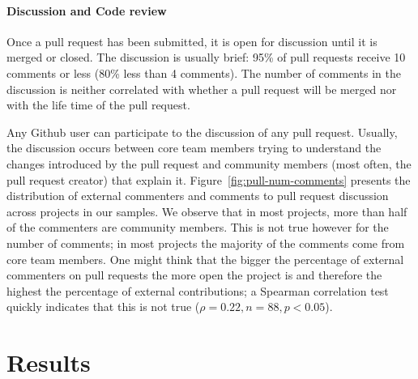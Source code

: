 \documentclass{sig-alternate}
\begin{document}
\paragraph*{Discussion and Code review}

Once a pull request has been submitted, it is open for discussion until
it is merged or closed. The discussion is usually brief: 95\% of pull
requests receive 10 comments or less (80\% less than 4 comments). 
The number of comments in the discussion is neither correlated with
whether a pull request will be merged nor with the life time of the
pull request.

Any Github user can participate to the discussion of any pull request.  Usually,
the discussion occurs between core team members trying to understand the changes
introduced by the pull request and community members (most often, the pull
request creator) that explain it.  Figure~\ref{fig:pull-num-comments} presents
the distribution of external commenters and comments to pull request discussion
across projects in our samples. We observe that in most projects, more than half
of the commenters are community members. This is not true however for the number
of comments; in most projects the majority of the comments come from core team
members. One might think that the bigger the percentage of external commenters
on pull requests the more open the project is and therefore the highest the
percentage of external contributions; a Spearman correlation test quickly
indicates that this is not true ($\rho = 0.22, n = 88, p < 0.05$).

\section{Results}
\label{sec:accrej}
\end{document}
